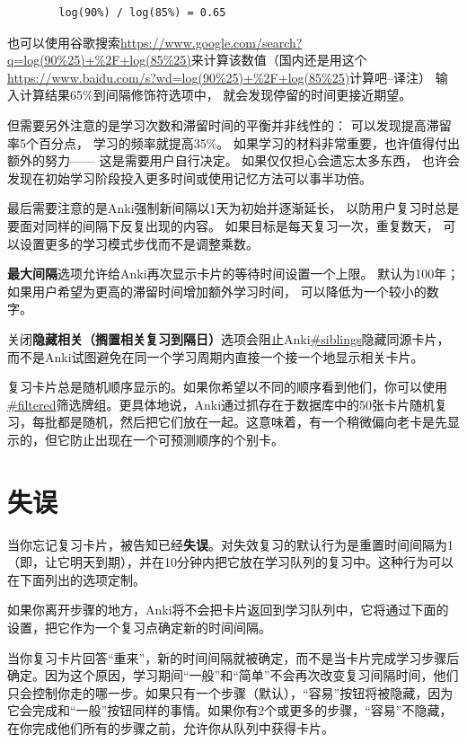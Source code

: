 \documentclass[a4paper]{book}
\begin{document}
	\begin{shaded}\begin{verbatim}
		log(90%) / log(85%) = 0.65
		\end{verbatim}\end{shaded}
	也可以使用谷歌搜索\url{https://www.google.com/search?q=log(90%25)+%2F+log(85%25)}来计算该数值（国内还是用这个\url{https://www.baidu.com/s?wd=log(90%25)+%2F+log(85%25)}计算吧--译注）
		输入计算结果65\%到间隔修饰符选项中， 就会发现停留的时间更接近期望。
		
		但需要另外注意的是学习次数和滞留时间的平衡并非线性的： 可以发现提高滞留率5个百分点， 学习的频率就提高35\%。 如果学习的材料非常重要，也许值得付出额外的努力—— 这是需要用户自行决定。 如果仅仅担心会遗忘太多东西， 也许会发现在初始学习阶段投入更多时间或使用记忆方法可以事半功倍。
		
		最后需要注意的是Anki强制新间隔以1天为初始并逐渐延长， 以防用户复习时总是要面对同样的间隔下反复出现的内容。 如果目标是每天复习一次，重复数天， 可以设置更多的学习模式步伐而不是调整乘数。
		
		\textbf{最大间隔}选项允许给Anki再次显示卡片的等待时间设置一个上限。 默认为100年；如果用户希望为更高的滞留时间增加额外学习时间， 可以降低为一个较小的数字。
		
		关闭\textbf{隐藏相关（搁置相关复习到隔日）}选项会阻止Anki\url{#siblings}隐藏同源卡片，而不是Anki试图避免在同一个学习周期内直接一个接一个地显示相关卡片。
		
		\begin{shaded}
			复习卡片总是随机顺序显示的。如果你希望以不同的顺序看到他们，你可以使用\url{#filtered}筛选牌组。更具体地说，Anki通过抓存在于数据库中的50张卡片随机复习，每批都是随机，然后把它们放在一起。这意味着，有一个稍微偏向老卡是先显示的，但它防止出现在一个可预测顺序的个别卡。
		\end{shaded}
		\section{失误}\label{lapses}
		当你忘记复习卡片，被告知已经\textbf{失误}。对失效复习的默认行为是重置时间间隔为1（即，让它明天到期），并在10分钟内把它放在学习队列的复习中。这种行为可以在下面列出的选项定制。
		
		如果你离开步骤的地方，Anki将不会把卡片返回到学习队列中，它将通过下面的设置，把它作为一个复习点确定新的时间间隔。
		
		\begin{shaded}
			当你复习卡片回答“重来”，新的时间间隔就被确定，而不是当卡片完成学习步骤后确定。因为这个原因，学习期间“一般”和“简单”不会再次改变复习间隔时间，他们只会控制你走的哪一步。如果只有一个步骤（默认），“容易”按钮将被隐藏，因为它会完成和“一般”按钮同样的事情。如果你有2个或更多的步骤，“容易”不隐藏，在你完成他们所有的步骤之前，允许你从队列中获得卡片。
		\end{shaded}
		
\end{document}
